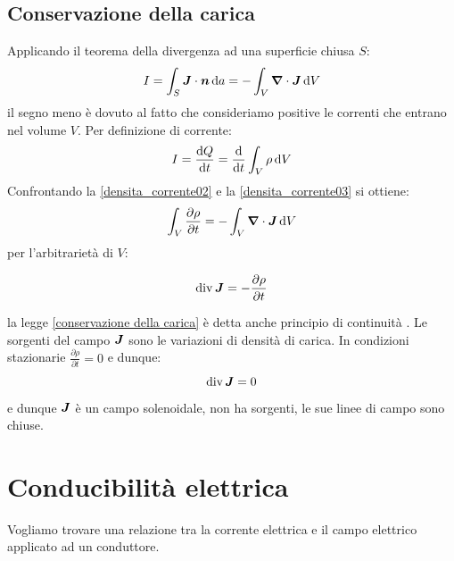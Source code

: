 \subsection{Conservazione della carica}
Applicando il teorema della divergenza ad una superficie chiusa $S$:
\begin{equation}
  I=\int_S \boldsymbol{J}\cdot\boldsymbol{n}\,\mathrm{d} a=-\int_V\boldsymbol{\nabla}\cdot\boldsymbol{J}\,\mathrm{d} V
  \label{densita_corrente02}
\end{equation}
il segno meno è dovuto al fatto che consideriamo positive le correnti che entrano nel volume $V$. Per definizione di corrente:
\begin{equation}
  I=\frac{\mathrm{d} Q}{\mathrm{d} t}=\frac{\mathrm{d}}{\mathrm{d} t}\int_V\rho\,\mathrm{d} V
  \label{densita_corrente03}
\end{equation}
Confrontando la \eqref{densita_corrente02} e la \eqref{densita_corrente03} si ottiene:
\[\int_V\frac{\partial \rho}{\partial t}=-\int_V\boldsymbol{\nabla}\cdot\boldsymbol{J}\,\mathrm{d} V\]
per l'arbitrarietà di $V$:
\begin{legge}
  \begin{equation}
    \operatorname{div}\boldsymbol{J}=-\frac{\partial \rho}{\partial t}
  \end{equation}
  \label{conservazione della carica}
\end{legge}
la legge \eqref{conservazione della carica} è detta anche principio di continuità . Le sorgenti del campo $\boldsymbol{J}$ sono le variazioni di densità di carica. In condizioni stazionarie $\frac{\partial\rho}{\partial t}=0$ e dunque:
\[\operatorname{div} \boldsymbol{J}=0\]
e dunque $\boldsymbol{J}$ è un campo solenoidale, non ha sorgenti, le sue linee di campo sono chiuse.
\section{Conducibilità elettrica}
Vogliamo trovare una relazione tra la corrente elettrica e il campo elettrico applicato ad un conduttore.

